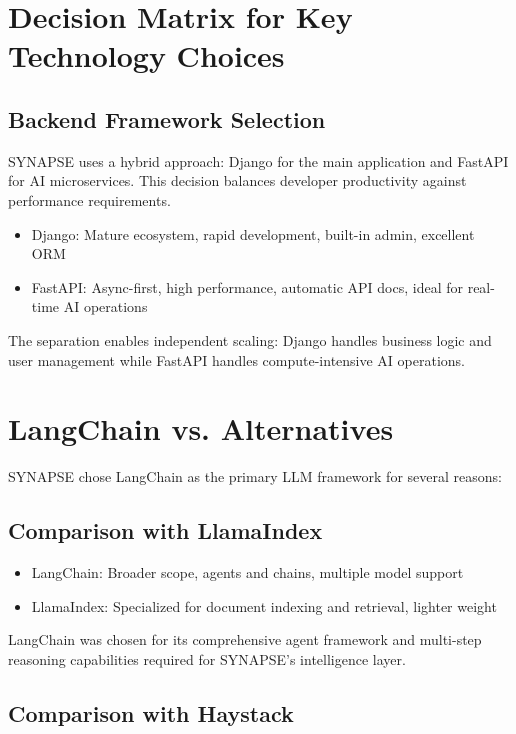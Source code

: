 \documentclass[12pt,a4paper]{report}
\begin{document}
\section{Decision Matrix for Key Technology Choices}

\subsection{Backend Framework Selection}

SYNAPSE uses a hybrid approach: Django for the main application and FastAPI for AI microservices. This decision balances developer productivity against performance requirements.

\begin{itemize}
    \item Django: Mature ecosystem, rapid development, built-in admin, excellent ORM
    \item FastAPI: Async-first, high performance, automatic API docs, ideal for real-time AI operations
\end{itemize}

The separation enables independent scaling: Django handles business logic and user management while FastAPI handles compute-intensive AI operations.

\section{LangChain vs. Alternatives}

SYNAPSE chose LangChain as the primary LLM framework for several reasons:

\subsection{Comparison with LlamaIndex}

\begin{itemize}
    \item LangChain: Broader scope, agents and chains, multiple model support
    \item LlamaIndex: Specialized for document indexing and retrieval, lighter weight
\end{itemize}

LangChain was chosen for its comprehensive agent framework and multi-step reasoning capabilities required for SYNAPSE's intelligence layer.

\subsection{Comparison with Haystack}
\end{document}
